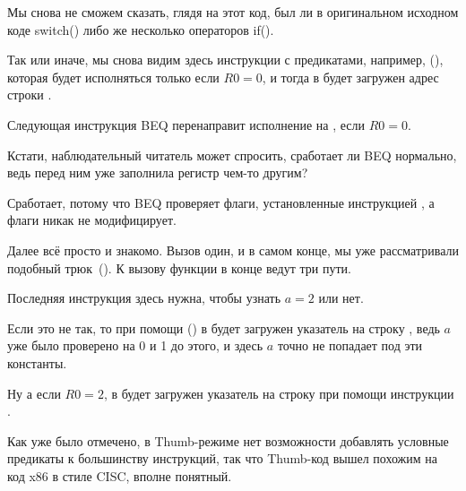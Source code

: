 


Мы снова не сможем сказать, глядя на этот код, был ли в оригинальном исходном коде switch() 
либо же несколько операторов if().

Так или иначе, мы снова видим здесь инструкции с предикатами, например, \ADREQ (), 
которая будет исполняться только
если $R0=0$, и тогда в  будет загружен адрес строки .

Следующая инструкция \ac{BEQ} перенаправит исполнение на , если $R0=0$.

Кстати, наблюдательный читатель может спросить, сработает ли \ac{BEQ} нормально,
ведь \ADREQ перед ним уже заполнила регистр  чем-то другим?

Сработает, потому что \ac{BEQ} проверяет флаги, установленные инструкцией \CMP, 
а \ADREQ флаги никак не модифицирует.

Далее всё просто и знакомо. 
Вызов \printf один, и в самом конце, мы уже рассматривали подобный трюк~().
К вызову функции \printf{} в конце ведут три пути.

Последняя инструкция  здесь нужна, чтобы узнать $a=2$ или нет.

Если это не так, то при помощи \ADRNE () в  будет загружен указатель на 
строку , ведь $a$ уже было проверено на 0 и 1 до этого, 
и здесь $a$ точно не попадает под эти константы.

Ну а если $R0=2$, в  будет загружен указатель на строку  при помощи инструкции \ADREQ.




Как уже было отмечено, в Thumb-режиме нет возможности добавлять условные предикаты к большинству инструкций,
так что Thumb-код вышел похожим на код x86 в стиле \ac{CISC}, вполне понятный.


